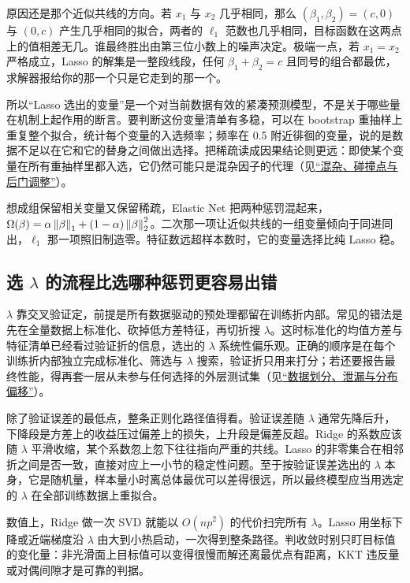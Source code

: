 原因还是那个近似共线的方向。若 \(x_1\) 与 \(x_2\) 几乎相同，那么 \((\beta_1,\beta_2)=(c,0)\) 与 \((0,c)\) 产生几乎相同的拟合，两者的 \(\ell_1\) 范数也几乎相同，目标函数在这两点上的值相差无几。谁最终胜出由第三位小数上的噪声决定。极端一点，若 \(x_1=x_2\) 严格成立，Lasso 的解集是一整段线段，任何 \(\beta_1+\beta_2=c\) 且同号的组合都最优，求解器报给你的那一个只是它走到的那一个。

所以``Lasso 选出的变量''是一个对当前数据有效的紧凑预测模型，不是关于哪些量在机制上起作用的断言。要判断这份变量清单有多稳，可以在 bootstrap 重抽样上重复整个拟合，统计每个变量的入选频率；频率在 0.5 附近徘徊的变量，说的是数据不足以在它和它的替身之间做出选择。把稀疏读成因果结论则更远：即使某个变量在所有重抽样里都入选，它仍然可能只是混杂因子的代理（见\hyperref[sec:13-Machine-Learning/12-Causal-Inference/03]{``混杂、碰撞点与后门调整''}）。

想成组保留相关变量又保留稀疏，Elastic Net 把两种惩罚混起来，\(\Omega(\beta)=\alpha\left\lVert\beta\right\rVert_1+(1-\alpha)\left\lVert\beta\right\rVert_2^2\)。二次那一项让近似共线的一组变量倾向于同进同出，\(\ell_1\) 那一项照旧制造零。特征数远超样本数时，它的变量选择比纯 Lasso 稳。

\subsection{选 \(\lambda\) 的流程比选哪种惩罚更容易出错}

\(\lambda\) 靠交叉验证定，前提是所有数据驱动的预处理都留在训练折内部。常见的错法是先在全量数据上标准化、砍掉低方差特征，再切折搜 \(\lambda\)。这时标准化的均值方差与特征清单已经看过验证折的信息，选出的 \(\lambda\) 系统性偏乐观。正确的顺序是在每个训练折内部独立完成标准化、筛选与 \(\lambda\) 搜索，验证折只用来打分；若还要报告最终性能，得再套一层从未参与任何选择的外层测试集（见\hyperref[sec:13-Machine-Learning/01-Learning-Problems-and-Evaluation/04]{``数据划分、泄漏与分布偏移''}）。

除了验证误差的最低点，整条正则化路径值得看。验证误差随 \(\lambda\) 通常先降后升，下降段是方差上的收益压过偏差上的损失，上升段是偏差反超。Ridge 的系数应该随 \(\lambda\) 平滑收缩，某个系数忽上忽下往往指向严重的共线。Lasso 的非零集合在相邻折之间是否一致，直接对应上一小节的稳定性问题。至于按验证误差选出的 \(\lambda\) 本身，它是随机量，样本量小时离总体最优可以差得很远，所以最终模型应当用选定的 \(\lambda\) 在全部训练数据上重拟合。

数值上，Ridge 做一次 SVD 就能以 \(O(np^2)\) 的代价扫完所有 \(\lambda\)。Lasso 用坐标下降或近端梯度沿 \(\lambda\) 由大到小热启动，一次得到整条路径。判收敛时别只盯目标值的变化量：非光滑面上目标值可以变得很慢而解还离最优点有距离，KKT 违反量或对偶间隙才是可靠的判据。

